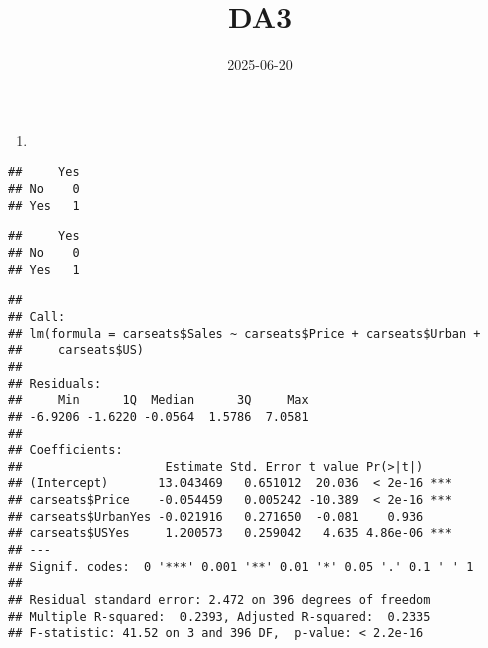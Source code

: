 \documentclass[
]{article}
\title{DA3}
\author{}
\date{\vspace{-2.5em}2025-06-20}
\newenvironment{Shaded}{\begin{snugshade}}{\end{snugshade}}
\newcommand{\FunctionTok}[1]{\textcolor[rgb]{0.13,0.29,0.53}{\textbf{#1}}}
\newcommand{\NormalTok}[1]{#1}
\newcommand{\OtherTok}[1]{\textcolor[rgb]{0.56,0.35,0.01}{#1}}
\newcommand{\SpecialCharTok}[1]{\textcolor[rgb]{0.81,0.36,0.00}{\textbf{#1}}}
\newcommand{\StringTok}[1]{\textcolor[rgb]{0.31,0.60,0.02}{#1}}
\providecommand{\tightlist}{%
  \setlength{\itemsep}{0pt}\setlength{\parskip}{0pt}}
\begin{document}
\maketitle

\begin{enumerate}
\def\labelenumi{\arabic{enumi})}
\setcounter{enumi}{9}
\tightlist
\item
\end{enumerate}

\begin{Shaded}
\end{Shaded}

\begin{verbatim}
##     Yes
## No    0
## Yes   1
\end{verbatim}

\begin{Shaded}
\end{Shaded}

\begin{verbatim}
##     Yes
## No    0
## Yes   1
\end{verbatim}

\begin{Shaded}
\end{Shaded}

\begin{verbatim}
## 
## Call:
## lm(formula = carseats$Sales ~ carseats$Price + carseats$Urban + 
##     carseats$US)
## 
## Residuals:
##     Min      1Q  Median      3Q     Max 
## -6.9206 -1.6220 -0.0564  1.5786  7.0581 
## 
## Coefficients:
##                    Estimate Std. Error t value Pr(>|t|)    
## (Intercept)       13.043469   0.651012  20.036  < 2e-16 ***
## carseats$Price    -0.054459   0.005242 -10.389  < 2e-16 ***
## carseats$UrbanYes -0.021916   0.271650  -0.081    0.936    
## carseats$USYes     1.200573   0.259042   4.635 4.86e-06 ***
## ---
## Signif. codes:  0 '***' 0.001 '**' 0.01 '*' 0.05 '.' 0.1 ' ' 1
## 
## Residual standard error: 2.472 on 396 degrees of freedom
## Multiple R-squared:  0.2393, Adjusted R-squared:  0.2335 
## F-statistic: 41.52 on 3 and 396 DF,  p-value: < 2.2e-16
\end{verbatim}
\end{document}
